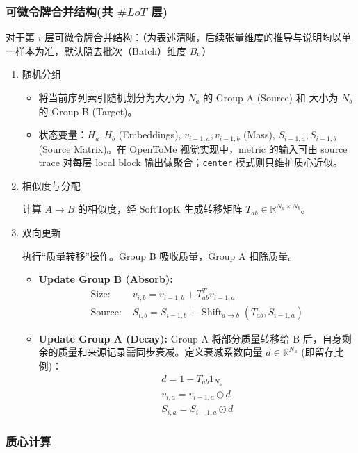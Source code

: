 \documentclass[a4paper,11pt]{article}
\begin{document}
\subsubsection{可微令牌合并结构(共 $\#LoT$ 层)}
对于第 $i$ 层可微令牌合并结构：（为表述清晰，后续张量维度的推导与说明均以单一样本为准，默认隐去批次（Batch）维度 $B$。）
\begin{enumerate}
    \item 随机分组
\begin{itemize}
    \item 将当前序列索引随机划分为大小为 $N_a$ 的 Group A (Source) 和 大小为 $N_b$ 的 Group B (Target)。
    \item 状态变量：$H_a,H_b$ (Embeddings), $v_{i-1,a}, v_{i-1,b}$ (Mass), $S_{i-1,a}, S_{i-1,b}$ (Source Matrix)。在 OpenToMe 视觉实现中，metric 的输入可由 source trace 对每层 local block 输出做聚合；\texttt{center} 模式则只维护质心近似。
\end{itemize}
    \item  相似度与分配
    
计算 $A \rightarrow B$ 的相似度，经 SoftTopK 生成转移矩阵 $T_{ab} \in \mathbb{R}^{N_{a} \times N_{b}}$。
\item 双向更新

执行“质量转移”操作。Group B 吸收质量，Group A 扣除质量。

\begin{itemize}
    \item \textbf{Update Group B (Absorb):}
    \begin{align*}
        \text{Size: } & v_{i,b} = v_{i-1,b} + T_{ab}^{T}v_{i-1,a} \\
        \text{Source: } & {S}_{i,b} = S_{i-1,b} + \operatorname{Shift}_{a\rightarrow b}(T_{ab}, S_{i-1,a})
    \end{align*}

    \item \textbf{Update Group A (Decay):}
    Group A 将部分质量转移给 B 后，自身剩余的质量和来源记录需同步衰减。定义衰减系数向量 $d \in \mathbb{R}^{N_{a}}$ (即留存比例)：
    \begin{align*}
        d = 1 - T_{ab} 1_{N_{b}}\\
        v_{i,a} = v_{i-1,a} \odot d\\
        S_{i,a} = S_{i-1,a} \odot d
    \end{align*}
\end{itemize}
\end{enumerate}
\subsubsection{质心计算}
\end{document}
